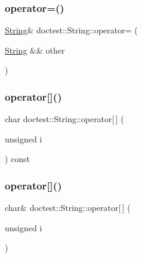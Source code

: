 \mbox{\label{classdoctest_1_1_string_a6099dbedeb150eb5659c7aa5dcea1727}} 
\subsubsection{\texorpdfstring{operator=()}{operator=()}\hspace{0.1cm}{\footnotesize\ttfamily [2/2]}}
{\footnotesize\ttfamily \mbox{\hyperlink{classdoctest_1_1_string}{String}}\& doctest\+::\+String\+::operator= (\begin{DoxyParamCaption}\item[{\mbox{\hyperlink{classdoctest_1_1_string}{String}} \&\&}]{other }\end{DoxyParamCaption})}

\mbox{\label{classdoctest_1_1_string_adf69290bc23e8c7bf60a9bcf765ebc10}} 
\subsubsection{\texorpdfstring{operator[]()}{operator[]()}\hspace{0.1cm}{\footnotesize\ttfamily [1/2]}}
{\footnotesize\ttfamily char doctest\+::\+String\+::operator\mbox{[}$\,$\mbox{]} (\begin{DoxyParamCaption}\item[{unsigned}]{i }\end{DoxyParamCaption}) const}

\mbox{\label{classdoctest_1_1_string_acd37c72485c1277fc673f6b328138b40}} 
\subsubsection{\texorpdfstring{operator[]()}{operator[]()}\hspace{0.1cm}{\footnotesize\ttfamily [2/2]}}
{\footnotesize\ttfamily char\& doctest\+::\+String\+::operator\mbox{[}$\,$\mbox{]} (\begin{DoxyParamCaption}\item[{unsigned}]{i }\end{DoxyParamCaption})}


